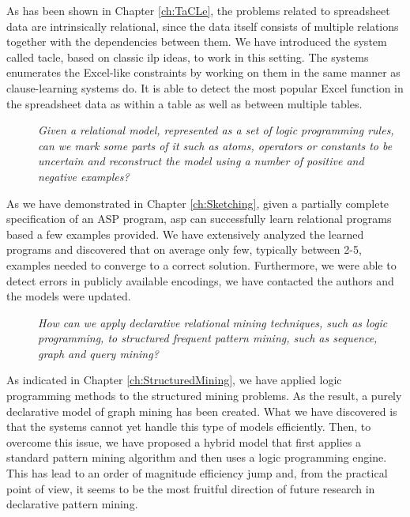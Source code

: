 As has been shown in Chapter \ref{ch:TaCLe}, the problems related to
spreadsheet data are intrinsically relational, since the data itself
consists of multiple relations together with the dependencies between
them. We have introduced the system called \acrlong{tacle}, based on
classic \acrshort{ilp} ideas, to work in this setting. The systems
enumerates the Excel-like constraints by working on them in the same
manner as clause-learning systems do. It is able to detect the most
popular Excel function in the spreadsheet data as within a table as
well as between multiple tables.

\begin{description}
    \item[\cthree] \textit{Given a relational model, represented as a set of logic
    programming rules, can we mark some parts of it such as atoms,
    operators or constants to be uncertain and reconstruct the model
    using a number of positive and negative examples?}
\end{description}

As we have demonstrated in Chapter \ref{ch:Sketching}, given a
partially complete specification of an ASP program, \acrshort{asp}
can successfully learn relational programs based a few examples
provided. We have extensively analyzed the learned programs and
discovered that on average only few, typically between 2-5, examples needed to
converge to a correct solution. Furthermore, we were able to detect
errors in publicly available encodings, we have contacted the authors
and the models were updated.


\begin{description}
\item[\cfour]  \textit{How can we apply declarative relational mining
    techniques, such as logic programming, to structured frequent pattern mining, such as sequence, graph and query mining?}
\end{description}

As indicated in Chapter \ref{ch:StructuredMining}, we have applied 
logic programming methods to the structured mining problems. As the
result, 
a purely declarative model of graph mining has been created. What we
have discovered is that the systems cannot yet handle this type of
models efficiently. Then, to overcome this issue, we have proposed a hybrid model that
first applies a standard pattern mining algorithm and then uses a
logic programming engine. This has lead to an order of magnitude
efficiency jump and, from the practical point of view, it seems to be
the most fruitful direction of future research in declarative pattern
mining.



\cleardoublepage

